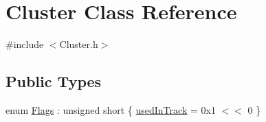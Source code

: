 \hypertarget{classCluster}{}\section{Cluster Class Reference}
\label{classCluster}


{\ttfamily \#include $<$Cluster.\+h$>$}

\subsection*{Public Types}
\begin{DoxyCompactItemize}
\item 
enum \hyperlink{classCluster_a161820c1803e25a96fb5075c63828451}{Flags} \+: unsigned short \{ \hyperlink{classCluster_a161820c1803e25a96fb5075c63828451a07b5d8988299b30135aecdb9cf48d0c5}{used\+In\+Track} = 0x1 $<$$<$ 0
 \}
\end{DoxyCompactItemize}
